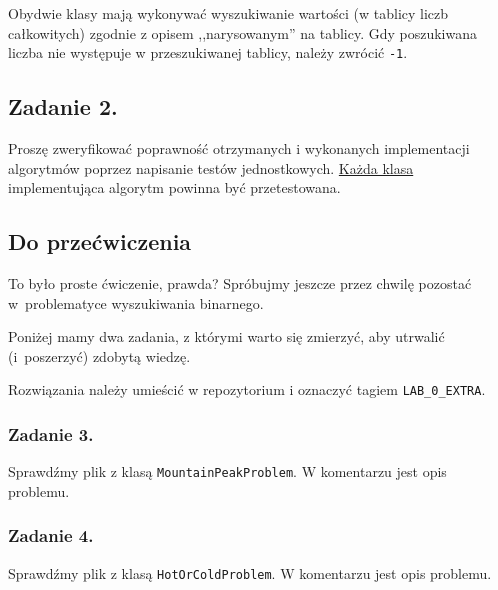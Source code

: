 \documentclass[twoside]{article}
\begin{document}
Obydwie klasy mają wykonywać wyszukiwanie wartości (w tablicy liczb całkowitych) zgodnie z opisem
,,narysowanym'' na tablicy.
Gdy poszukiwana liczba nie występuje w przeszukiwanej tablicy, należy zwrócić \verb|-1|.

\subsection{Zadanie 2.}

Proszę zweryfikować poprawność otrzymanych i wykonanych implementacji algorytmów poprzez napisanie testów jednostkowych.
\underline{Każda klasa} implementująca algorytm powinna być przetestowana.

\subsection{Do przećwiczenia}
To było proste ćwiczenie, prawda?
Spróbujmy jeszcze przez chwilę pozostać w~problematyce wyszukiwania binarnego.

Poniżej mamy dwa zadania, z którymi warto się zmierzyć, aby utrwalić (i~poszerzyć) zdobytą wiedzę.

Rozwiązania należy umieścić w repozytorium i oznaczyć tagiem \verb|LAB_0_EXTRA|.

\subsubsection{Zadanie 3.}
Sprawdźmy plik z klasą \verb|MountainPeakProblem|. W komentarzu jest opis problemu.

\subsubsection{Zadanie 4.}
Sprawdźmy plik z klasą \verb|HotOrColdProblem|. W komentarzu jest opis problemu.
\end{document}
